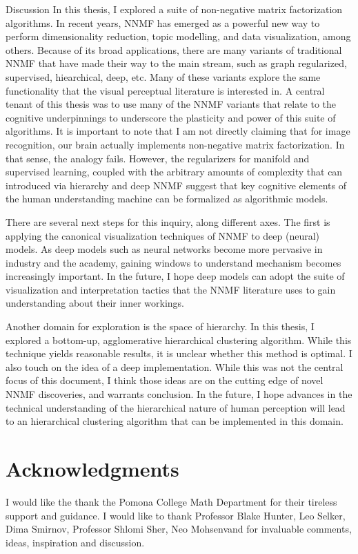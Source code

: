\documentclass[12pt]{pom_thesis}
\begin{document}
\begin{chapter}{Discussion}
	In this thesis, I explored a suite of non-negative matrix factorization algorithms. In recent years, NNMF has emerged as a powerful new way to perform dimensionality reduction, topic modelling, and data visualization, among others. Because of its broad applications, there are many variants of traditional NNMF that have made their way to the main stream, such as graph regularized, supervised, hiearchical, deep, etc. Many of these variants explore the same functionality that the visual perceptual literature is interested in.  A central tenant of this thesis was to use many of the NNMF variants that relate to the cognitive underpinnings to underscore the plasticity and power of this suite of algorithms. It is important to note that I am not directly claiming that for image recognition, our brain actually implements non-negative matrix factorization. In that sense, the analogy fails. However, the regularizers for manifold and supervised learning, coupled with the arbitrary amounts of complexity that can introduced via hierarchy and deep NNMF suggest that key cognitive elements of the human understanding machine can be formalized as algorithmic models. 
	
	There are several next steps for this inquiry, along different axes. The first is applying the canonical visualization techniques of NNMF to deep (neural) models. As deep models such as neural networks become more pervasive in industry and the academy, gaining windows to understand mechanism becomes increasingly important. In the future, I hope deep models can adopt the suite of visualization and interpretation tactics that the NNMF literature uses to gain understanding about their inner workings. 
	
	Another domain for exploration is the space of hierarchy. In this thesis, I explored a bottom-up, agglomerative hierarchical clustering algorithm. While this technique yields reasonable results, it is unclear whether this method is optimal. I also touch on the idea of a deep implementation. While this was not the central focus of this document, I think those ideas are on the cutting edge of novel NNMF discoveries, and warrants conclusion. In the future, I hope advances in the technical understanding of the hierarchical nature of human perception will lead to an hierarchical clustering algorithm that can be implemented in this domain.
	
	\end{chapter}
\section*{Acknowledgments}
I would like the thank the Pomona College Math Department for their tireless support and guidance.  I would like to thank Professor Blake Hunter, Leo Selker, Dima Smirnov, Professor Shlomi Sher, Neo Mohsenvand for invaluable comments, ideas, inspiration and discussion. 
\newpage
\end{document}
